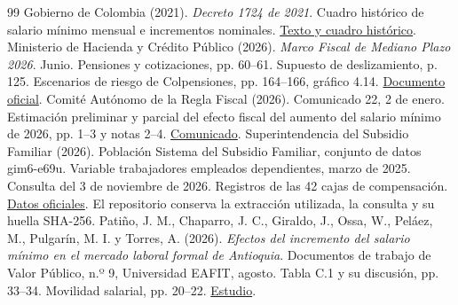 \begin{thebibliography}{99}
 Gobierno de Colombia (2021). \textit{Decreto 1724 de 2021}. Cuadro histórico de salario mínimo mensual e incrementos nominales. \href{https://www.funcionpublica.gov.co/eva/gestornormativo/norma_pdf.php?i=174267}{Texto y cuadro histórico}.
 Ministerio de Hacienda y Crédito Público (2026). \textit{Marco Fiscal de Mediano Plazo 2026}. Junio. Pensiones y cotizaciones, pp. 60--61. Supuesto de deslizamiento, p. 125. Escenarios de riesgo de Colpensiones, pp. 164--166, gráfico 4.14. \href{https://www.minhacienda.gov.co/documents/d/portal/mfmp-2026?download=true}{Documento oficial}.
 Comité Autónomo de la Regla Fiscal (2026). Comunicado 22, 2 de enero. Estimación preliminar y parcial del efecto fiscal del aumento del salario mínimo de 2026, pp. 1--3 y notas 2--4. \href{https://www.carf.gov.co/documents/d/guest/comunicado-22-estimacion-preliminar-efecto-fiscal-de-aumento-de-salario-minimo-2026?download=true}{Comunicado}.
 Superintendencia del Subsidio Familiar (2026). Población Sistema del Subsidio Familiar, conjunto de datos gim6-e69u. Variable trabajadores empleados dependientes, marzo de 2025. Consulta del 3 de noviembre de 2026. Registros de las 42 cajas de compensación. \href{https://www.datos.gov.co/d/gim6-e69u}{Datos oficiales}. El repositorio conserva la extracción utilizada, la consulta y su huella SHA-256.
 Patiño, J. M., Chaparro, J. C., Giraldo, J., Ossa, W., Peláez, M., Pulgarín, M. I. y Torres, A. (2026). \textit{Efectos del incremento del salario mínimo en el mercado laboral formal de Antioquia}. Documentos de trabajo de Valor Público, n.º 9, Universidad EAFIT, agosto. Tabla C.1 y su discusión, pp. 33--34. Movilidad salarial, pp. 20--22. \href{https://universidadeafit.widen.net/s/pk5kd8xjpm/efectos_del_incremento_del_salario_minimo_en_el_mercado_laboral_formal_de_antioquia}{Estudio}.
\end{thebibliography}

